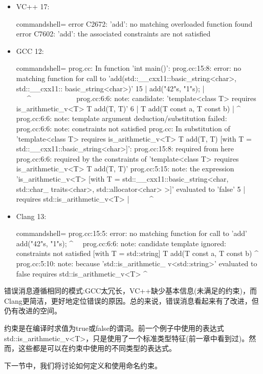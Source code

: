 \begin{itemize}
\item
VC++ 17:

\begin{tcblisting}{commandshell={}}
error C2672: 'add': no matching overloaded function found
error C7602: 'add': the associated constraints are not
satisfied
\end{tcblisting}

\item
GCC 12:

\begin{tcblisting}{commandshell={}}
prog.cc: In function 'int main()':
prog.cc:15:8: error: no matching function for call
to 'add(std::__cxx11::basic_string<char>, std::__cxx11::
basic_string<char>)'
  15 |    add("42"s, "1"s);
     |     ~~~^~~~~~~~~~~~~
prog.cc:6:6: note: candidate: 'template<class T> 
requires is_arithmetic_v<T> T add(T, T)'
  6  |    T add(T const a, T const b)
     |      ^~~
prog.cc:6:6: note: template argument deduction/substitution
 failed:
prog.cc:6:6: note: constraints not satisfied
prog.cc: In substitution of 'template<class
T> requires is_arithmetic_v<T> T add(T, T) [with T =
std::__cxx11::basic_string<char>]':
prog.cc:15:8: required from here
prog.cc:6:6: required by the constraints of
'template<class T> requires is_arithmetic_v<T> T add(T,
T)'
prog.cc:5:15: note: the expression 'is_arithmetic_v<T>
[with T = std::__cxx11::basic_string<char, std::char_
traits<char>, std::allocator<char> >]' evaluated to 'false'
    5 | requires std::is_arithmetic_v<T>
      |               ~~~~~^~~~~~~~~~~~~~~~~~
\end{tcblisting}

\item
Clang 13:

\begin{tcblisting}{commandshell={}}
prog.cc:15:5: error: no matching function for call to
'add'
add("42"s, "1"s);
^~~
prog.cc:6:6: note: candidate template ignored:
constraints not satisfied [with T = std::string]
T add(T const a, T const b)
^
prog.cc:5:10: note: because 'std::is_arithmetic_
v<std::string>' evaluated to false
requires std::is_arithmetic_v<T>
^
\end{tcblisting}
\end{itemize}

错误消息遵循相同的模式:GCC太冗长，VC++缺少基本信息(未满足的约束)，而Clang更简洁，更好地定位错误的原因。总的来说，错误消息看起来有了改进，但仍有改进的空间。

约束是在编译时求值为true或false的谓词。前一个例子中使用的表达式std::is\_arithmetic\_v<T>，只是使用了一个标准类型特征(前一章中看到过)。然而，这些都是可以在约束中使用的不同类型的表达式。

下一节中，我们将讨论如何定义和使用命名约束。
























